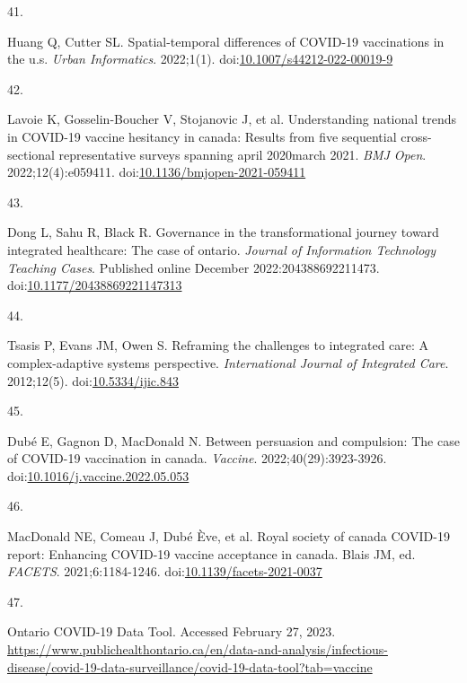 \documentclass[
  letterpaper,
  DIV=11,
  numbers=noendperiod]{scrartcl}
\newlength{\cslhangindent}
\newlength{\csllabelwidth}
\newlength{\cslentryspacingunit} %
\newenvironment{CSLReferences}[2] %
 {%
  \setlength{\parindent}{0pt}
  \ifodd #1
  \let\oldpar\par
  \def\par{\hangindent=\cslhangindent\oldpar}
  \fi
  \setlength{\parskip}{#2\cslentryspacingunit}
 }%
 {}
\newcommand{\CSLLeftMargin}[1]{\parbox[t]{\csllabelwidth}{#1}}
\newcommand{\CSLRightInline}[1]{\parbox[t]{\linewidth - \csllabelwidth}{#1}\break}
\begin{document}
\begin{CSLReferences}{0}{0}
\leavevmode{}%
\CSLLeftMargin{41. }%
\CSLRightInline{Huang Q, Cutter SL. Spatial-temporal differences of
{COVID}-19 vaccinations in the u.s. \emph{Urban Informatics}. 2022;1(1).
doi:\href{https://doi.org/10.1007/s44212-022-00019-9}{10.1007/s44212-022-00019-9}}

\leavevmode{}%
\CSLLeftMargin{42. }%
\CSLRightInline{Lavoie K, Gosselin-Boucher V, Stojanovic J, et al.
Understanding national trends in {COVID}-19 vaccine hesitancy in canada:
Results from five sequential cross-sectional representative surveys
spanning april 2020{\textendash}march 2021. \emph{{BMJ} Open}.
2022;12(4):e059411.
doi:\href{https://doi.org/10.1136/bmjopen-2021-059411}{10.1136/bmjopen-2021-059411}}

\leavevmode{}%
\CSLLeftMargin{43. }%
\CSLRightInline{Dong L, Sahu R, Black R. Governance in the
transformational journey toward integrated healthcare: The case of
ontario. \emph{Journal of Information Technology Teaching Cases}.
Published online December 2022:204388692211473.
doi:\href{https://doi.org/10.1177/20438869221147313}{10.1177/20438869221147313}}

\leavevmode{}%
\CSLLeftMargin{44. }%
\CSLRightInline{Tsasis P, Evans JM, Owen S. Reframing the challenges to
integrated care: A complex-adaptive systems perspective.
\emph{International Journal of Integrated Care}. 2012;12(5).
doi:\href{https://doi.org/10.5334/ijic.843}{10.5334/ijic.843}}

\leavevmode{}%
\CSLLeftMargin{45. }%
\CSLRightInline{Dubé E, Gagnon D, MacDonald N. Between persuasion and
compulsion: The case of {COVID}-19 vaccination in canada.
\emph{Vaccine}. 2022;40(29):3923-3926.
doi:\href{https://doi.org/10.1016/j.vaccine.2022.05.053}{10.1016/j.vaccine.2022.05.053}}

\leavevmode{}%
\CSLLeftMargin{46. }%
\CSLRightInline{MacDonald NE, Comeau J, Dubé Ève, et al. Royal society
of canada {COVID}-19 report: Enhancing {COVID}-19 vaccine acceptance in
canada. Blais JM, ed. \emph{{FACETS}}. 2021;6:1184-1246.
doi:\href{https://doi.org/10.1139/facets-2021-0037}{10.1139/facets-2021-0037}}

\leavevmode{}%
\CSLLeftMargin{47. }%
\CSLRightInline{{Ontario COVID-19 Data Tool}. Accessed February 27,
2023.
\url{https://www.publichealthontario.ca/en/data-and-analysis/infectious-disease/covid-19-data-surveillance/covid-19-data-tool?tab=vaccine}}


\end{CSLReferences}
\end{document}
